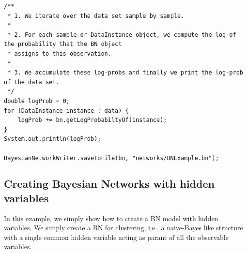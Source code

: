 \begin{lstlisting}
/**
 * 1. We iterate over the data set sample by sample.
 *
 * 2. For each sample or DataInstance object, we compute the log of the probability that the BN object
 * assigns to this observation.
 *
 * 3. We accumulate these log-probs and finally we print the log-prob of the data set.
 */
double logProb = 0;
for (DataInstance instance : data) {
    logProb += bn.getLogProbabiltyOf(instance);
}
System.out.println(logProb);

BayesianNetworkWriter.saveToFile(bn, "networks/BNExample.bn");
\end{lstlisting}


\subsection{Creating Bayesian Networks with hidden variables}

In this example, we simply show how to create a BN model with hidden variables. We simply create a BN for clustering, i.e.,  a naive-Bayes like structure with a single common hidden variable acting as parant of all the observable variables.
 

